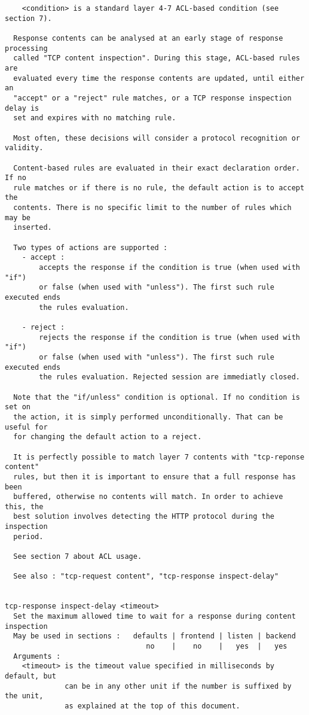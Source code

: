 \begin{verbatim}
    <condition> is a standard layer 4-7 ACL-based condition (see section 7).

  Response contents can be analysed at an early stage of response processing
  called "TCP content inspection". During this stage, ACL-based rules are
  evaluated every time the response contents are updated, until either an
  "accept" or a "reject" rule matches, or a TCP response inspection delay is
  set and expires with no matching rule. 

  Most often, these decisions will consider a protocol recognition or validity.

  Content-based rules are evaluated in their exact declaration order. If no
  rule matches or if there is no rule, the default action is to accept the
  contents. There is no specific limit to the number of rules which may be
  inserted.

  Two types of actions are supported :
    - accept :
        accepts the response if the condition is true (when used with "if")
        or false (when used with "unless"). The first such rule executed ends
        the rules evaluation.

    - reject :
        rejects the response if the condition is true (when used with "if")
        or false (when used with "unless"). The first such rule executed ends
        the rules evaluation. Rejected session are immediatly closed.

  Note that the "if/unless" condition is optional. If no condition is set on
  the action, it is simply performed unconditionally. That can be useful for
  for changing the default action to a reject.

  It is perfectly possible to match layer 7 contents with "tcp-reponse content"
  rules, but then it is important to ensure that a full response has been
  buffered, otherwise no contents will match. In order to achieve this, the
  best solution involves detecting the HTTP protocol during the inspection
  period.

  See section 7 about ACL usage.

  See also : "tcp-request content", "tcp-response inspect-delay"


tcp-response inspect-delay <timeout>
  Set the maximum allowed time to wait for a response during content inspection
  May be used in sections :   defaults | frontend | listen | backend
                                 no    |    no    |   yes  |   yes
  Arguments :
    <timeout> is the timeout value specified in milliseconds by default, but
              can be in any other unit if the number is suffixed by the unit,
              as explained at the top of this document.


\end{verbatim}
